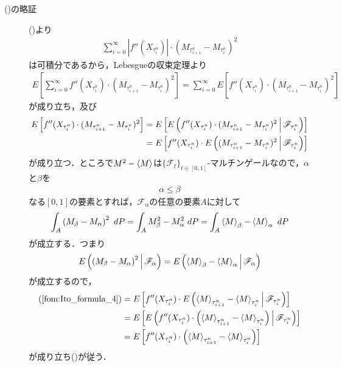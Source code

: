 \begin{sketch}
\begin{description}
			\item[()の略証]
				()より
				\begin{align}
					\sum_{i=0}^{\infty} \left|f''(X_{\tau^{n}_{i}})\right| \cdot (M_{\tau^{n}_{i+1}} - M_{\tau^{n}_{i}})^{2}
				\end{align}
				は可積分であるから，Lebesgueの収束定理より
				\begin{align}
					E\left[\sum_{i=0}^{\infty} f''(X_{\tau^{n}_{i}}) \cdot (M_{\tau^{n}_{i+1}} - M_{\tau^{n}_{i}})^{2}\right]
					= \sum_{i=0}^{\infty} E\left[f''(X_{\tau^{n}_{i}}) \cdot (M_{\tau^{n}_{i+1}} - M_{\tau^{n}_{i}})^{2}\right]
				\end{align}
				が成り立ち，及び
				\begin{align}
					E\left[f''(X_{\tau^{n}_{i}}) \cdot (M_{\tau^{n}_{i+1}} - M_{\tau^{n}_{i}})^{2}\right]
					&= E\left[E\left( f''(X_{\tau^{n}_{i}}) \cdot (M_{\tau^{n}_{i+1}} - M_{\tau^{n}_{i}})^{2} \, \middle|\, \mathscr{F}_{\tau^{n}_{i}} \right)\right] \\
					&= E\left[f''(X_{\tau^{n}_{i}}) \cdot E\left( (M_{\tau^{n}_{i+1}} - M_{\tau^{n}_{i}})^{2} \, \middle|\, \mathscr{F}_{\tau^{n}_{i}} \right)\right]
					\label{fom:Ito_formula_4}
				\end{align}
				が成り立つ．ところで$M^{2} - \inprod<M>$は$\{\mathscr{F}_{t}\}_{t \in [0,1]}$-マルチンゲールなので，$\alpha$と$\beta$を
				\begin{align}
					\alpha \leq \beta
				\end{align}
				なる$[0,1]$の要素とすれば，$\mathscr{F}_{\alpha}$の任意の要素$A$に対して
				\begin{align}
					\int_{A} \left(M_{\beta} - M_{\alpha}\right)^{2}\ dP
					= \int_{A} M_{\beta}^{2} - M_{\alpha}^{2}\ dP
					= \int_{A} \inprod<M>_{\beta} - \inprod<M>_{\alpha}\ dP
				\end{align}
				が成立する．つまり
				\begin{align}
					\cexp{\left(M_{\beta} - M_{\alpha}\right)^{2}}{\mathscr{F}_{\alpha}}
					= \cexp{\inprod<M>_{\beta} - \inprod<M>_{\alpha}}{\mathscr{F}_{\alpha}}
				\end{align}
				が成立するので，
				\begin{align}
					(\refeq{fom:Ito_formula_4})
					&= E\left[f''(X_{\tau^{n}_{i}}) \cdot \cexp{\inprod<M>_{\tau^{n}_{i+1}} - \inprod<M>_{\tau^{n}_{i}}}{\mathscr{F}_{\tau^{n}_{i}}}\right] \\
					&= E\left[\cexp{f''(X_{\tau^{n}_{i}}) \cdot \left(\inprod<M>_{\tau^{n}_{i+1}} - \inprod<M>_{\tau^{n}_{i}}\right)}{\mathscr{F}_{\tau^{n}_{i}}}\right] \\
					&= E\left[f''(X_{\tau^{n}_{i}}) \cdot \left(\inprod<M>_{\tau^{n}_{i+1}} - \inprod<M>_{\tau^{n}_{i}}\right)\right]
				\end{align}
				が成り立ち()が従う．
		\end{description}
	\end{sketch}